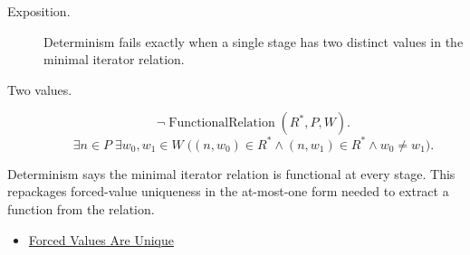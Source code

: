 \begin{remark*}
\begin{description}
  \item[Exposition.]
  Determinism fails exactly when a single stage has two distinct values in the
  minimal iterator relation.
  \item[Two values.]
  \[
  \neg\operatorname{FunctionalRelation}(R^*,P,W).
  \]
  \[
  \exists n\in P\;\exists w_0,w_1\in W\;
  \bigl((n,w_0)\in R^*\land (n,w_1)\in R^*\land w_0\neq w_1\bigr).
  \]
\end{description}
\end{remark*}

\begin{remark*}[Interpretation]
Determinism says the minimal iterator relation is functional at every stage.
This repackages forced-value uniqueness in the at-most-one form needed to
extract a function from the relation.
\end{remark*}

\begin{dependencies}
\begin{itemize}
  \item \hyperref[lem:forced-values-are-unique]{Forced Values Are Unique}
\end{itemize}
\end{dependencies}

